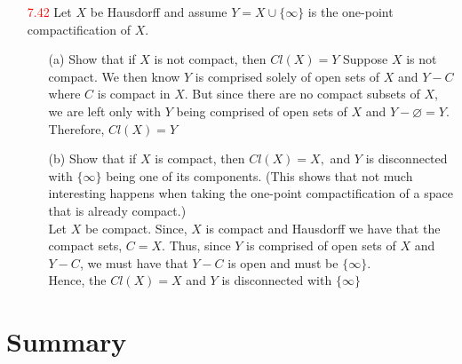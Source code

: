 \documentclass[12pt]{article}
\newcommand{\ak}[1]{\textcolor{red}{#1}}
\begin{document}
\begin{enumerate}
		\item[\ak{7.42}] Let $X$ be Hausdorff and assume $Y = X \cup \{ \infty \}$ is the one-point compactification of $X .$
		\begin{enumerate}
			\item[(a)] Show that if $X$ is not compact, then $C l ( X ) = Y$
			Suppose $ X $ is not compact. We then know $ Y $ is comprised solely of open sets of $ X $ and $ Y-C $ where $ C $ is compact in $ X $. But since there are no compact subsets of $ X $, we are left only with $ Y $ being comprised of open sets of $ X $ and $ Y-\varnothing = Y$. \\
			Therefore, $ Cl(X)=Y $
				\item[(b)] Show that if $X$ is compact, then $C l ( X ) = X ,$ and $Y$ is disconnected with
			$\{ \infty \}$ being one of its components. (This shows that not much interesting
			happens when taking the one-point compactification of a space that is
			already compact.)\\
			Let $ X $ be compact.  Since, $ X $ is compact and Hausdorff we have that the compact sets, $ C = X $. Thus, since $ Y $ is comprised of open sets of $ X $ and $ Y-C $, we must have that $ Y-C $ is open and must be $ \{\infty\} $. \\
			Hence, the $ Cl(X)=X $ and $ Y $ is disconnected with $ \{\infty\} $
		\end{enumerate}
	\end{enumerate}
	\section*{Summary}
\end{document}
